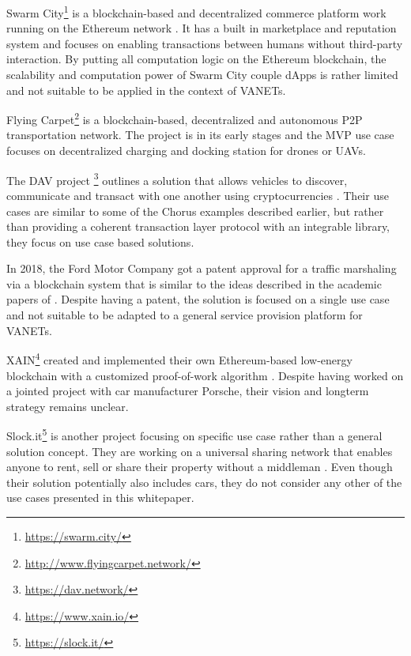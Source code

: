 \documentclass{llncs}
\begin{document}
{			Swarm City\footnote{\url{https://swarm.city/}} is a blockchain-based and decentralized commerce platform work running on the Ethereum network \cite{swarmWhitepaper1}\cite{swarmWhitepaper2}. It has a built in marketplace and reputation system and focuses on enabling transactions between humans without third-party interaction. By putting all computation logic on the Ethereum blockchain, the scalability and computation power of Swarm City couple dApps is rather limited and not suitable to be applied in the context of VANETs.

			Flying Carpet\footnote{\url{http://www.flyingcarpet.network/}} is a blockchain-based, decentralized and autonomous P2P transportation network. The project is in its early stages and the MVP use case focuses on decentralized charging and docking station for drones or UAVs.

			The DAV project \footnote{\url{https://dav.network/}} outlines a solution that allows vehicles to discover, communicate and transact with one another using cryptocurrencies \cite{davWhitepaper}. Their use cases are similar to some of the Chorus examples described earlier, but rather than providing a coherent transaction layer protocol with an integrable library, they focus on use case based solutions.
			
			In 2018, the Ford Motor Company got a patent approval for a traffic marshaling via a blockchain system \cite{macneille2018vehicle} that is similar to the ideas described in the academic papers of \cite{leiding2016self}. Despite having a patent, the solution is focused on a single use case and not suitable to be adapted to a general service provision platform for VANETs. 

			XAIN\footnote{\url{https://www.xain.io/}} created and implemented their own Ethereum-based low-energy blockchain with a customized proof-of-work algorithm \cite{xainWhitepaper}. Despite having worked on a jointed project with car manufacturer Porsche, their vision and longterm strategy remains unclear.

			Slock.it\footnote{\url{https://slock.it/}} is another project focusing on specific use case rather than a general solution concept. They are working on a universal sharing network that enables anyone to rent, sell or share their property without a middleman \cite{slockWhitepaper}. Even though their solution potentially also includes cars, they do not consider any other of the use cases presented in this whitepaper.

		
}
\end{document}
